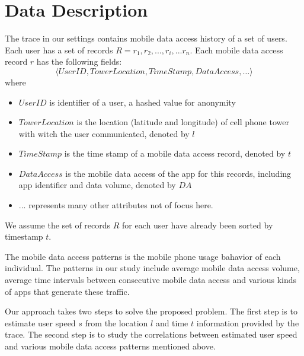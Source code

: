 \section{Data Description}

The trace in our settings contains mobile data access history of a set of users. Each user has a set of records $R = {r_1, r_2, ...,r_i, ... r_n}$.
Each mobile data access record $r$ has the following fields:
\begin{equation*}
  \langle UserID, TowerLocation, TimeStamp, DataAccess, \dots \rangle
\end{equation*}
where
\begin{itemize}
  \item $UserID$ is identifier of a user, a hashed value for anonymity
  \item $TowerLocation$ is the location (latitude and longitude) of cell phone tower with witch the user communicated, denoted by $l$
  \item $TimeStamp$ is the time stamp of a mobile data access record, denoted by $t$
  \item $DataAccess$ is the mobile data access of the app for this records, including app identifier and data volume, denoted by $DA$
  \item ... represents many other attributes not of focus here.
\end{itemize}
We assume the set of records $R$ for each user have already been sorted by timestamp $t$.

The mobile data access patterns is the mobile phone usage bahavior of each individual. The patterns in our study include average mobile data access volume, average time intervals between consecutive mobile data access and various kinds of apps that generate these traffic.

Our approach takes two steps to solve the proposed problem. The first step is to estimate user speed $s$ from the location $l$ and time $t$ information provided by the trace. The second step is to study the correlations between estimated user speed and various mobile data access patterns mentioned above.

